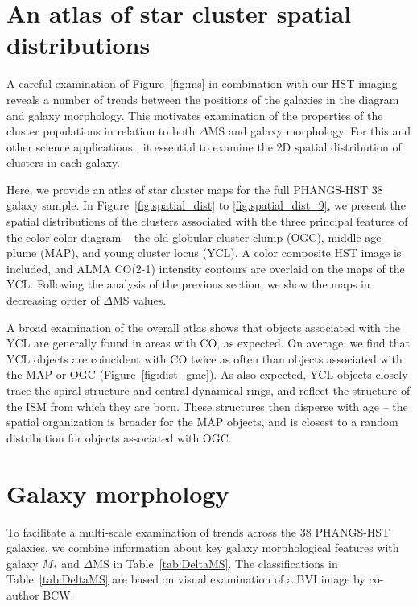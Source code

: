 \documentclass[]{aastex631}
\begin{document}
\section{An atlas of star cluster spatial distributions}\label{sect:spatialdist}

A careful examination of Figure~\ref{fig:ms} in combination with our HST imaging reveals a number of trends between the positions of the galaxies in the diagram and galaxy morphology.  This motivates examination of the properties of the cluster populations in relation to both $\Delta$MS and galaxy morphology.  For this and other science applications \citep[e.g., calculation of correlation functions, constraints on star formation timescales, and comparison with simulations, e.g.,][]{Gouliermis14, grasha_spatial_2015, grasha_hierarchical_2017, grasha_spatial_2019, turner22}, it essential to examine the 2D spatial distribution of clusters in each galaxy.

Here, we provide an atlas of star cluster maps for the full PHANGS-HST 38 galaxy sample.  In Figure~\ref{fig:spatial_dist} to \ref{fig:spatial_dist_9}, we present the spatial distributions of the clusters associated with the three principal features of the color-color diagram -- the old globular cluster clump (OGC), middle age plume (MAP), and young cluster locus (YCL).  A color composite HST image is included, and ALMA CO(2-1) intensity contours are overlaid on the maps of the YCL. Following the analysis of the previous section, we show the maps in decreasing order of $\Delta$MS values.   

A broad examination of the overall atlas shows that objects associated with the YCL are generally found in areas with CO, as expected. On average, we find that YCL objects are coincident with CO twice as often than objects associated with the MAP or OGC (Figure~\ref{fig:dist_gmc}).   As also expected, YCL objects closely trace the spiral structure and central dynamical rings, and reflect the structure of the ISM from which they are born.  These structures then disperse with age -- the spatial organization is broader for the MAP objects, and is closest to a random distribution for objects associated with OGC.

\section{Galaxy morphology}
To facilitate a multi-scale examination of trends across the 38 PHANGS-HST galaxies, we combine information about key galaxy morphological features with galaxy $M_*$ and $\Delta$MS in Table~\ref{tab:DeltaMS}. The classifications in Table~\ref{tab:DeltaMS} are based on visual examination of a BVI image by co-author BCW. 
\end{document}
